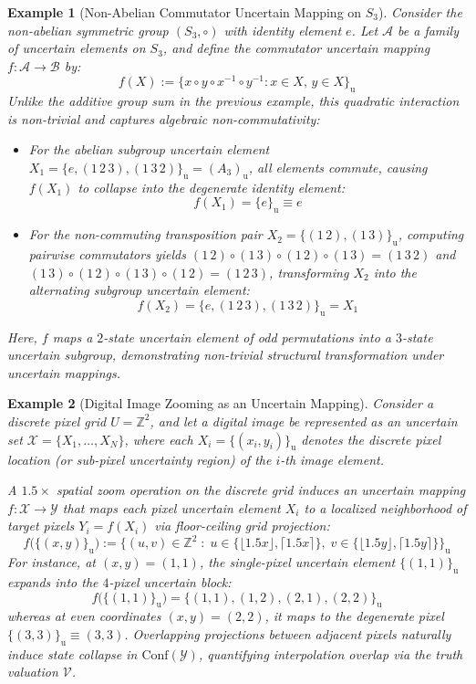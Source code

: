 \documentclass[a4paper,12pt, twoside]{memoir}
\newtheorem{example}{Example}[chapter]
\newcommand{\tbd}[1]{\mathcal{#1}} %
\newcommand{\s}[1]{\{#1\}_\mathrm{u}} %
\begin{document}
	\begin{example}[Non-Abelian Commutator Uncertain Mapping on $S_3$]
		Consider the non-abelian symmetric group $(S_3, \circ)$ with identity element $e$. Let $\tbd{A}$ be a family of uncertain elements on $S_3$, and define the commutator uncertain mapping $f : \tbd{A} \to \tbd{B}$ by:
		\[
		f(X) := \big\{ x \circ y \circ x^{-1} \circ y^{-1} : x \in X, \, y \in X \big\}_\mathrm{u}
		\]
		Unlike the additive group sum in the previous example, this quadratic interaction is non-trivial and captures algebraic non-commutativity:
		\begin{itemize}[leftmargin=*]
			\item For the abelian subgroup uncertain element $X_1 = \big\{ e, (1\,2\,3), (1\,3\,2) \big\}_\mathrm{u} = (A_3)_\mathrm{u}$, all elements commute, causing $f(X_1)$ to collapse into the degenerate identity element:
			\[
			f(X_1) = \s{e} \equiv e
			\]
			\item For the non-commuting transposition pair $X_2 = \big\{ (1\,2), (1\,3) \big\}_\mathrm{u}$, computing pairwise commutators yields $(1\,2)\circ(1\,3)\circ(1\,2)\circ(1\,3) = (1\,3\,2)$ and $(1\,3)\circ(1\,2)\circ(1\,3)\circ(1\,2) = (1\,2\,3)$, transforming $X_2$ into the alternating subgroup uncertain element:
			\[
			f(X_2) = \big\{ e, (1\,2\,3), (1\,3\,2) \big\}_\mathrm{u} = X_1
			\]
		\end{itemize}
		Here, $f$ maps a $2$-state uncertain element of odd permutations into a $3$-state uncertain subgroup, demonstrating non-trivial structural transformation under uncertain mappings.
	\end{example}
	\begin{example}[Digital Image Zooming as an Uncertain Mapping]
		Consider a discrete pixel grid $U = \mathbb{Z}^2$, and let a digital image be represented as an uncertain set $\tbd{X} = \{X_1, \dots, X_N\}$, where each $X_i = \s{(x_i, y_i)}$ denotes the discrete pixel location (or sub-pixel uncertainty region) of the $i$-th image element.
		
		A $1.5\times$ spatial zoom operation on the discrete grid induces an uncertain mapping $f : \tbd{X} \to \tbd{Y}$ that maps each pixel uncertain element $X_i$ to a localized neighborhood of target pixels $Y_i = f(X_i)$ via floor-ceiling grid projection:
		\[
		f\big(\s{(x, y)}\big) := \Big\{ (u, v) \in \mathbb{Z}^2 \;:\; u \in \{\lfloor 1.5x \rfloor, \lceil 1.5x \rceil\}, \; v \in \{\lfloor 1.5y \rfloor, \lceil 1.5y \rceil\} \Big\}_\mathrm{u}
		\]
		For instance, at $(x, y) = (1, 1)$, the single-pixel uncertain element $\s{(1, 1)}$ expands into the $4$-pixel uncertain block:
		\[
		f\big(\s{(1, 1)}\big) = \big\{ (1, 1), (1, 2), (2, 1), (2, 2) \big\}_\mathrm{u}
		\]
		whereas at even coordinates $(x, y) = (2, 2)$, it maps to the degenerate pixel $\s{(3, 3)} \equiv (3, 3)$. Overlapping projections between adjacent pixels naturally induce state collapse in $\mathrm{Conf}(\tbd{Y})$, quantifying interpolation overlap via the truth valuation $\mathcal{V}$.
	\end{example}
\end{document}
